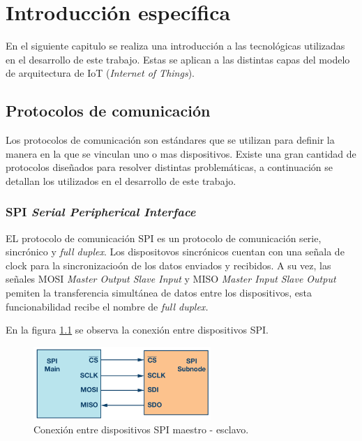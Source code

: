 \chapter{Introducción específica} %

\label{Chapter2}

En el siguiente capitulo se realiza una introducción a las tecnológicas utilizadas en el desarrollo de este trabajo. Estas se aplican a las distintas capas del modelo de arquitectura de IoT (\textit{Internet of Things}).
\section{Protocolos de comunicación}
\label{sec:ejemplo}

Los protocolos de comunicación son estándares que se utilizan para definir la manera en la que se vinculan uno o mas dispositivos. Existe una gran cantidad de protocolos diseñados para resolver distintas problemáticas, a continuación se detallan los utilizados en el desarrollo de este trabajo.

\subsection{SPI \textit{Serial Peripherical Interface}}

EL protocolo de comunicación SPI es un protocolo de comunicación serie, sincrónico y \textit{full duplex}. Los dispositovos sincrónicos cuentan con una señala de clock para la sincronizacioón de los datos enviados y recibidos. A su vez, las señales MOSI \textit{Master Output Slave Input} y MISO \textit{Master Input Slave Output} pemiten la transferencia simultánea de datos entre los dispositivos, esta funcionabilidad recibe el nombre de \textit{full duplex.}

En la figura \ref{fig:SPI} se observa la conexión entre dispositivos SPI.

\begin{figure}[htbp]
	\centering
	\includegraphics[width=0.6\textwidth]{./Figures/SPI.png}
	\caption{Conexión entre dispositivos SPI maestro - esclavo.}
	\label{fig:SPI}
\end{figure} 

